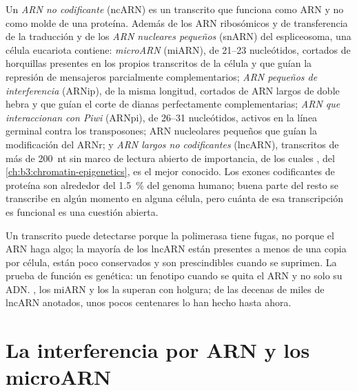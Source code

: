 \begin{definition}\label{def:b3:rna-regulation:ncrna}
Un \emph{ARN no codificante} (ncARN) es un transcrito que funciona como
ARN y no como molde de una proteína. Además de los ARN ribosómicos y de
transferencia de la traducción y de los \emph{ARN nucleares pequeños}
(snARN) del espliceosoma, una célula eucariota contiene: \emph{microARN}
(miARN), de \numrange{21}{23} nucleótidos, cortados de horquillas
presentes en los propios transcritos de la célula y que guían la
represión de mensajeros parcialmente complementarios; \emph{ARN pequeños
de interferencia} (ARNip), de la misma longitud, cortados de ARN largos
de doble hebra y que guían el corte de dianas perfectamente
complementarias; \emph{ARN que interaccionan con Piwi} (ARNpi), de
\numrange{26}{31} nucleótidos, activos en la línea germinal contra los
transposones; ARN nucleolares pequeños que guían la modificación del
ARNr; y \emph{ARN largos no codificantes} (lncARN), transcritos de más de
\qty{200}{nt} sin marco de lectura abierto de importancia, de los cuales
\emph{}, del \cref{ch:b3:chromatin-epigenetics}, es el mejor
conocido. Los exones codificantes de proteína son alrededor del
\qty{1.5}{\%} del genoma humano; buena parte del resto se transcribe en
algún momento en alguna célula, pero cuánta de esa transcripción es
funcional es una cuestión abierta.
\end{definition}

\begin{remark}\label{rem:b3:rna-regulation:function}
Un transcrito puede detectarse porque la polimerasa tiene fugas, no
porque el ARN haga algo; la mayoría de los lncARN están presentes a menos
de una copia por célula, están poco conservados y son prescindibles
cuando se suprimen. La prueba de función es genética: un fenotipo cuando
se quita el ARN y no solo su ADN. \emph{}, los miARN y los  la
superan con holgura; de las decenas de miles de lncARN anotados, unos
pocos centenares lo han hecho hasta ahora.
\end{remark}

\section{La interferencia por ARN y los microARN}

